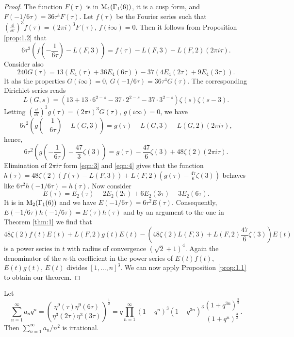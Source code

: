 \begin{proof}
    The function $F(\tau)$ is in $\mathrm{M}_4(\Gamma_1(6))$, it is a cusp form, and $F(-1/6\tau) = 36 \tau^4 F(\tau)$.
    Let $f(\tau)$ be the Fourier series such that $(\frac{\dd}{\dd \tau})^{3} f(\tau) = (2 \pi i )^{3} F(\tau)$, $f(i \infty) = 0$.
    Then it follows from Proposition \ref{prop:1.2} that
    \begin{equation}
        \label{eqn:3}
        6 \tau^2 \left(f\left(-\frac{1}{6\tau}\right) - L(F, 3)\right) = f(\tau) - L(F, 3) - L(F, 2) (2 \pi i \tau).
    \end{equation}
    Consider also
    $$
        240 G(\tau) = 13 (E_4(\tau) + 36 E_4(6\tau)) - 37 (4E_4(2\tau) + 9E_4(3\tau)).
    $$
    It ahs the properties $G(i\infty) = 0$, $G(-1/6\tau) = 36 \tau^4 G(\tau)$.
    The corresponding Dirichlet series reads
    $$
        L(G, s) = (13 + 13 \cdot 6^{2-s} - 37 \cdot 2^{2-s} - 37 \cdot 3^{2-s}) \zeta(s) \zeta(s - 3).
    $$
    Letting $(\frac{\dd}{\dd \tau})^{3} g(\tau) = (2\pi i)^{3} G(\tau)$, $g(i\infty) = 0$, we have
    $$
        6 \tau^2 \left(g\left(-\frac{1}{6\tau}\right) - L(G, 3)\right) = g(\tau) - L(G, 3) - L(G, 2) (2 \pi i \tau),
    $$
    hence,
    \begin{equation}
        \label{eqn:4}
        6 \tau^2 \left(g\left(-\frac{1}{6\tau}\right) - \frac{47}{3}\zeta(3)\right) = g(\tau) - \frac{47}{6} \zeta(3) + 48 \zeta(2) (2\pi i \tau).
    \end{equation}
    Elimination of $2\pi i \tau$ form \eqref{eqn:3} and \eqref{eqn:4} gives that the function $h(\tau) = 48 \zeta(2) (f(\tau) - L(F, 3)) + L(F, 2) (g(\tau) - \frac{47}{6}\zeta(3))$ behaves like $6 \tau^2 h(-1/6 \tau) = h(\tau)$.
    Now consider
    $$
        E(\tau) = E_2(\tau) - 2E_2(2 \tau) + 6 E_2(3\tau) - 3 E_2(6\tau).
    $$
    It is in $\mathrm{M}_2(\Gamma_1(6))$ and we have $E(-1/6\tau) = 6 \tau^2 E(\tau)$.
    Consequently, $E(-1/6\tau) h(-1/6\tau) = E(\tau) h(\tau)$ and by an argument to the one in Theorem \ref{thm:1} we find that
    $$
        48 \zeta(2) f(t) E(t) + L(F, 2) g(t) E(t) - \left(48 \zeta(2) L(F, 3) + L(F, 2) \frac{47}{6} \zeta(3) \right) E(t)
    $$
    is a power series in $t$ with radius of convergence $(\sqrt{2} + 1)^4$.
    Again the denominator of the $n$-th coefficient in the power series of $E(t) f(t)$, $E(t) g(t)$, $E(t)$ divides $[1, \dots, n]^3$.
    We can now apply Proposition \ref{prop:1.1} to obtain our theorem.
\end{proof}

\begin{theorem}
    \label{thm:3}
    Let
    $$
        \sum_{n=1}^{\infty} a_n q^n = \left(\frac{\eta^9(\tau) \eta^9 (6\tau)}{\eta^3(2\tau) \eta^3(3 \tau)}\right)^{\frac{1}{2}} = q \prod_{n=1}^{\infty} (1 - q^n)^{3} (1 - q^{3n})^{3} \frac{(1 + q^{3n})^{\frac{9}{2}}}{(1 + q^{n})^{\frac{3}{2}}}.
    $$
    Then $\sum_{n=1}^{\infty} a_n / n^{2}$ is irrational.
\end{theorem}

